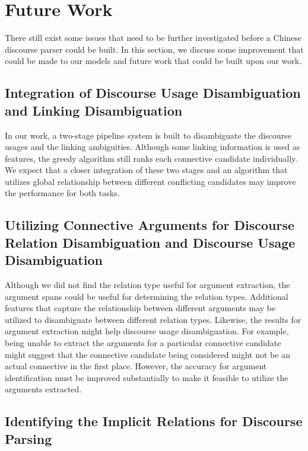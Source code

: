 \section{Future Work}

There still exist some issues that need to be further investigated
before a Chinese discourse parser could be built. In this section,
we discuss some improvement that could be made to our models and
future work that could be built upon our work.

\subsection{Integration of Discourse Usage Disambiguation and Linking Disambiguation}

In our work, a two-stage pipeline system is built to disambiguate
the discourse usages and the linking ambiguities. Although some linking
information is used as features, the greedy algorithm still ranks
each connective candidate individually. We expect that a closer integration
of these two stages and an algorithm that utilizes global relationship
between different conflicting candidates may improve the performance
for both tasks.

\subsection{Utilizing Connective Arguments for Discourse Relation Disambiguation
and Discourse Usage Disambiguation}

Although we did not find the relation type useful for
argument extraction, the argument spans could be useful for determining
the relation types.  Additional features that capture the relationship between
different arguments may be utilized to disambiguate between different relation
types. Likewise, the results for argument extraction might help
discourse usage disambiguation. For example, being unable to extract the arguments for
a particular connective candidate might suggest that the connective candidate
being considered might not be an actual connective in the first place.
However, the accuracy for argument identification must be improved
substantially to make it feasible to utilize the arguments extracted.

\subsection{Identifying the Implicit Relations for Discourse Parsing}


